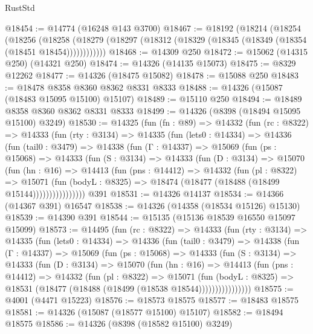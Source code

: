 \begin{lexlean}{RustStd}
\begin{coremodule}
@18454 := @14774 (@16248 @143 @3700)
@18467 := @18192
    (@18214
      (@18254
        (@18256
          (@18258 (@18279 (@18297 (@18312 (@18329 (@18345 (@18349 (@18354 (@18451 @18454))))))))))))
@18468 := @14309 @250
@18472 := @15062 (@14315 @250) (@14321 @250)
@18474 := @14326 (@14135 @15073)
@18475 := @8329 @12262
@18477 := @14326 (@18475 @15082)
@18478 := @15088 @250
@18483 := @18478 @8358 @8360 @8362 @8331 @8333
@18488 := @14326 (@15087 (@18483 @15095 @15100) @15107)
@18489 := @15110 @250
@18494 := @18489 @8358 @8360 @8362 @8331 @8333
@18499 := @14326 (@8398 (@18494 @15095 @15100) @3249)
@18530 := @14325
    (fun (fn : @89) =>
    @14332
      (fun (rc : @8322) =>
      @14333
        (fun (rty : @3134) =>
        @14335
          (fun (lets0 : @14334) =>
          @14336
            (fun (tail0 : @3479) =>
            @14338
              (fun (Γ : @14337) =>
              @15069
                (fun (ps : @15068) =>
                @14333
                  (fun (S : @3134) =>
                  @14333
                    (fun (D : @3134) =>
                    @15070
                      (fun (hn : @16) =>
                      @14413
                        (fun (pns : @14412) =>
                        @14332
                          (fun (pl : @8322) =>
                          @15071
                            (fun (bodyL : @8325) =>
                            @18474 (@18477 (@18488 (@18499 @15144))))))))))))))))
    @391
@18531 := @14326 @14137
@18534 := @14366 (@14367 @391) @16547
@18538 := @14326 (@14358 (@18534 @15126) @15130)
@18539 := @14390 @391
@18544 := @15135 (@15136 @18539 @16550 @15097 @15099)
@18573 := @14495
    (fun (rc : @8322) =>
    @14333
      (fun (rty : @3134) =>
      @14335
        (fun (lets0 : @14334) =>
        @14336
          (fun (tail0 : @3479) =>
          @14338
            (fun (Γ : @14337) =>
            @15069
              (fun (ps : @15068) =>
              @14333
                (fun (S : @3134) =>
                @14333
                  (fun (D : @3134) =>
                  @15070
                    (fun (hn : @16) =>
                    @14413
                      (fun (pns : @14412) =>
                      @14332
                        (fun (pl : @8322) =>
                        @15071
                          (fun (bodyL : @8325) =>
                          @18531 (@18477 (@18488 (@18499 (@18538 @18544))))))))))))))))
@18575 := @4001 (@4471 @15223)
@18576 := @18573 @18575
@18577 := @18483 @18575
@18581 := @14326 (@15087 (@18577 @15100) @15107)
@18582 := @18494 @18575
@18586 := @14326 (@8398 (@18582 @15100) @3249)

\end{coremodule}
\end{lexlean}

